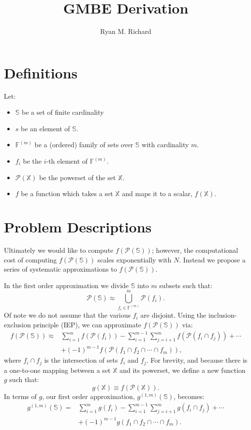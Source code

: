 \documentclass[11pt]{article}
\title{GMBE Derivation}
\author{Ryan M. Richard}
\newcommand{\fxn}[1]{f\left(#1\right)}
\newcommand{\gxn}[1]{g\left(#1\right)}
\newcommand{\pset}[1]{\mathcal{P}\left(#1\right)}
\newcommand{\setf}{\mathbb{F}}
\newcommand{\setfn}[1]{\setf^{(#1)}}
\newcommand{\sets}{\mathbb{S}}
\newcommand{\setx}{\mathbb{X}}
\newcommand{\fxns}{\fxn{\pset{\sets}}}
\newcommand{\gapprox}[1]{g^{(#1)}\left(\sets\right)}
\begin{document}
\maketitle

\section{Definitions}

Let:

\begin{itemize}
	\item $\sets$ be a set of finite cardinality
	\item $s$ be an element of $\sets$.
	\item $\setfn{m}$ be a (ordered) family of sets over $\sets$ with 
	      cardinality $m$.  
	\item $f_i$ be the $i$-th element of $\setfn{m}$.
	\item $\pset{\setx}$ be the powerset of the set $\setx$.
	\item $f$ be a function which takes a set $\setx$ and maps it to a
	      scalar, $\fxn{\setx}$.
\end{itemize}

\section{Problem Descriptions}

Ultimately we would like to compute $\fxns$; however, the computational cost of 
computing $\fxns$ scales exponentially with $N$. Instead we propose a series of 
systematic approximations to $\fxns$. 

In the first order approximation we divide $\sets$ into $m$ subsets such that:
\begin{equation}
	\pset{\sets} \approx \bigcup_{f_i\in \setfn{m}}^m \pset{f_i}.
\end{equation}
Of note we do not assume that the various $f_i$ are disjoint. Using the 
inclusion-exclusion principle (IEP), we can approximate $\fxns$ via:
\begin{align}
	\fxn{\pset{\sets}} \approx& \sum_{i=1}^m \fxn{\pset{f_i}} -
                       \sum_{i=1}^{m-1}\sum_{j=i+1}^{m} 
                       \fxn{\pset{f_i\cap f_j}} + \cdots \nonumber\\
                       &+\left(-1\right)^{m-1}
                       \fxn{\pset{f_1\cap f_2\cap\cdots\cap f_m}},
\end{align}
where $f_i\cap f_j$ is the intersection of sets $f_i$ and $f_j$. For brevity, 
and because there is a one-to-one mapping between a set $\setx$ and its 
powerset, we define a new function $g$ such that:
\begin{equation}
	\gxn{\setx} \equiv \fxn{\pset{\setx}}.
\end{equation}
In terms of $g$, our first order approximation, $\gapprox{1,m}$, becomes:
\begin{align}
	\gapprox{1,m} =& \sum_{i=1}^m \gxn{f_i} -
	\sum_{i=1}^{m-1}\sum_{j=i+1}^{m} 
	\gxn{f_i\cap f_j} + \cdots \nonumber\\
	&+\left(-1\right)^{m-1}
	\gxn{f_1\cap f_2\cap\cdots\cap f_m}.\label{eq:order1}
\end{align}
\end{document}
